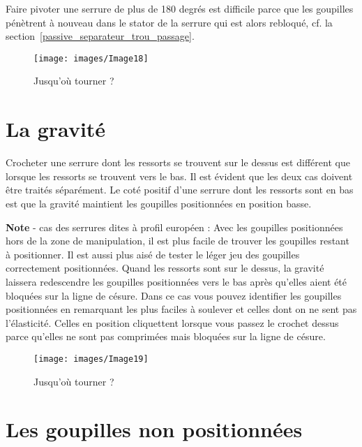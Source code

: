 \documentclass[a4paper,french,11pt,twoside]{report}
\begin{document}
Faire pivoter une serrure de plus de 180 degrés est difficile parce que les goupilles pénètrent à nouveau dans le stator de la serrure qui est alors rebloqué, cf. la section~\vref{passive_separateur_trou_passage}.


\begin{figure}[ht] \begin{center}
        \texttt{[image: images/Image18]}
        \caption{Jusqu'où tourner ?}
\end{center} \end{figure}


\section{La gravité}

Crocheter une serrure dont les ressorts se trouvent sur le dessus est différent que lorsque les ressorts se trouvent vers le bas. Il est évident que les deux cas doivent être traités séparément. Le coté positif d'une serrure dont les ressorts sont en bas est que la gravité maintient les goupilles positionnées en position basse.

\medskip
\noindent \textbf{Note} - cas des serrures dites à profil européen :
\noindent Avec les goupilles positionnées hors de la zone de manipulation, il est plus facile de trouver les goupilles restant à positionner. Il est aussi plus aisé de tester le léger jeu des goupilles correctement positionnées. Quand les ressorts sont sur le dessus, la gravité laissera redescendre les goupilles positionnées vers le bas après qu'elles aient été bloquées sur la ligne de césure. Dans ce cas vous pouvez identifier les goupilles positionnées en remarquant les plus faciles à soulever et celles dont on ne sent pas l'élasticité. Celles en position cliquettent lorsque vous passez le crochet dessus parce qu'elles ne sont pas comprimées mais bloquées sur la ligne de césure.

\begin{figure}[ht] \begin{center}
        \texttt{[image: images/Image19]}
        \caption{Jusqu'où tourner ?}
\end{center} \end{figure}


\section{Les goupilles non positionnées}
\end{document}
